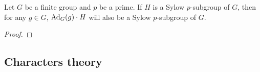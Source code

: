         \begin{lemma} \label{lemma: conjugacies_of_sylow_subgroups}
            Let $G$ be a finite group and $p$ be a prime. If $H$ is a Sylow $p$-subgroup of $G$, then for any $g \in G$, $\mathrm{Ad}_G(g) \cdot H$ will also be a Sylow $p$-subgroup of $G$.
        \end{lemma}
            \begin{proof}
                
            \end{proof}

    \subsection{Characters theory}